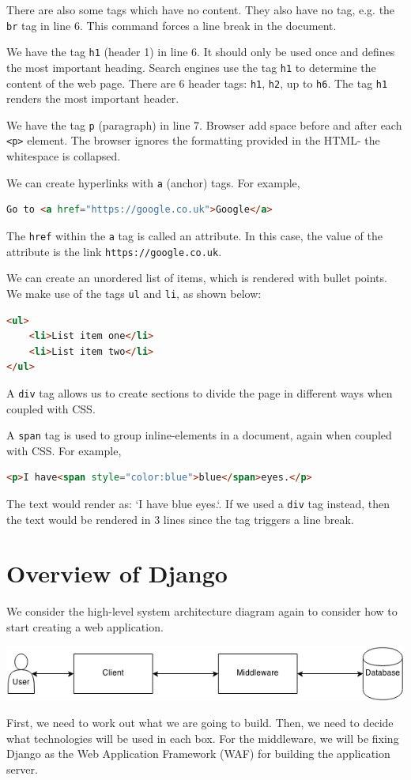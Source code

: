 \documentclass[a4paper, openany]{memoir}
\begin{document}
    There are also some tags which have no content. They also have no tag, e.g. the \texttt{br} tag in line 6. This command forces a line break in the document.

    We have the tag \texttt{h1} (header 1) in line 6. It should only be used once and defines the most important heading. Search engines use the tag \texttt{h1} to determine the content of the web page. There are 6 header tags: \texttt{h1}, \texttt{h2}, up to \texttt{h6}. The tag \texttt{h1} renders the most important header.

    We have the tag \texttt{p} (paragraph) in line 7. Browser add space before and after each \texttt{<p>} element. The browser ignores the formatting provided in the HTML- the whitespace is collapsed.

    We can create hyperlinks with \texttt{a} (anchor) tags. For example,
\begin{lstlisting}[language=html]
Go to <a href="https://google.co.uk">Google</a>
\end{lstlisting}
    The \texttt{href} within the \texttt{a} tag is called an attribute. In this case, the value of the attribute is the link \texttt{https://google.co.uk}.

    We can create an unordered list of items, which is rendered with bullet points. We make use of the tags \texttt{ul} and \texttt{li}, as shown below:
\begin{lstlisting}[language=html]
<ul>
    <li>List item one</li>
    <li>List item two</li>
</ul>
\end{lstlisting}

    A \texttt{div} tag allows us to create sections to divide the page in different ways when coupled with CSS.

    A \texttt{span} tag is used to group inline-elements in a document, again when coupled with CSS. For example,
\begin{lstlisting}[language=html]
<p>I have<span style="color:blue">blue</span>eyes.</p>
\end{lstlisting}
    The text would render as: `I have {\color{blue}blue} eyes.`. If we used a \texttt{div} tag instead, then the text would be rendered in 3 lines since the tag triggers a line break.
    \newpage

    \section{Overview of Django}
    We consider the high-level system architecture diagram again to consider how to start creating a web application.
    \begin{center}
        \includegraphics[scale=0.8]{src/L1I1.png}
    \end{center}
    First, we need to work out what we are going to build. Then, we need to decide what technologies will be used in each box. For the middleware, we will be fixing Django as the Web Application Framework (WAF) for building the application server.
\end{document}
